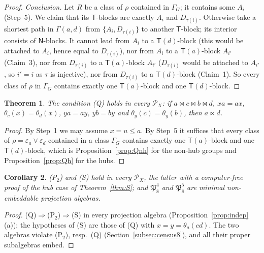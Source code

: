 \documentclass[11pt]{amsart}
\newtheorem{theorem}{Theorem}[section]
\newtheorem{corollary}[theorem]{Corollary}
\theoremstyle{definition}
\renewcommand{\P}{\mathcal{P}}
\newcommand{\T}{\mathsf{T}}
\newcommand{\N}{\mathsf{N}}
\newcommand{\mt}{\bowtie}   %
\begin{document}
\begin{proof}
\emph{Conclusion.} Let $R$ be a class of $\rho$ contained in $\Gamma_G$; it contains some $A_i$ (Step~5). We claim that its $\T$-blocks are exactly $A_i$ and $D_{\tau(i)}$. Otherwise take a shortest path in $\Gamma(a,d)$ from $\{A_i,D_{\tau(i)}\}$ to another $\T$-block; its interior consists of $\N$-blocks. It cannot lead from $A_i$ to a $\T(d)$-block (this would be attached to $A_i$, hence equal to $D_{\tau(i)}$), nor from $A_i$ to a $\T(a)$-block $A_{i'}$ (Claim~3), nor from $D_{\tau(i)}$ to a $\T(a)$-block $A_{i'}$ ($D_{\tau(i)}$ would be attached to $A_{i'}$, so $i'=i$ as $\tau$ is injective), nor from $D_{\tau(i)}$ to a $\T(d)$-block (Claim~1). So every class of $\rho$ in $\Gamma_G$ contains exactly one $\T(a)$-block and one $\T(d)$-block.
\end{proof}

\begin{theorem}\label{thm:Q}
The condition \textup{(Q)} holds in every $\P_X$: if $a\mt c\mt b\mt d$, $xa=ax$, $\theta_c(x)=\theta_d(x)$, $ya=ay$, $yb=by$ and $\theta_y(c)=\theta_y(b)$, then $a\mt d$.
\end{theorem}

\begin{proof}
By Step~1 we may assume $x=u\le a$. By Step~5 it suffices that every class of $\rho=\varepsilon_a\vee\varepsilon_d$ contained in a class $\Gamma_G$ contains exactly one $\T(a)$-block and one $\T(d)$-block, which is Proposition~\ref{prop:Qnh} for the non-hub groups and Proposition~\ref{prop:Qh} for the hubs.
\end{proof}

\begin{corollary}\label{cor:Q}
\textup{(P$_2$)} and \textup{(S)} hold in every $\P_X$, the latter with a computer-free proof of the hub case of Theorem~\ref{thm:S}; and $\mathfrak P_8^4$ and $\mathfrak P_8^5$ are minimal non-embeddable projection algebras.
\end{corollary}

\begin{proof}
(Q)$\Rightarrow$(P$_2$)$\Rightarrow$(S) in every projection algebra (Proposition~\ref{prop:indep}(a)); the hypotheses of (S) are those of (Q) with $x=y=\theta_a(cd)$. The two algebras violate (P$_2$), resp.\ (Q) (Section~\ref{subsec:census8}), and all their proper subalgebras embed.
\end{proof}
\end{document}
